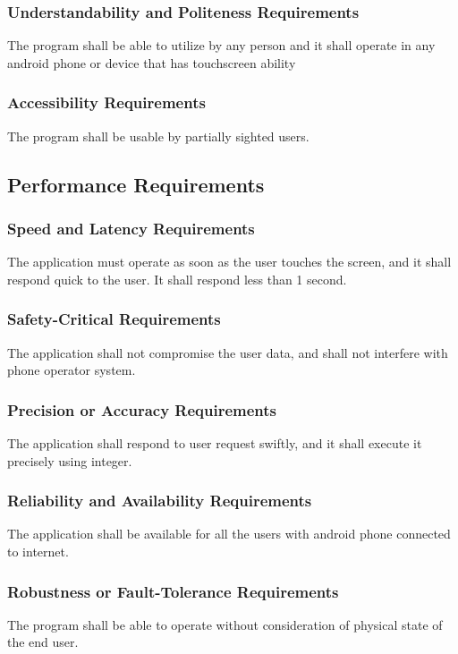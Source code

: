 \documentclass[12pt, titlepage]{article}
\begin{document}
\subsubsection{Understandability and Politeness Requirements}
The program shall be able to utilize by any person and it shall operate in any android phone or device that has touchscreen ability

\subsubsection{Accessibility Requirements}
The program shall be usable by partially sighted users.


\subsection{Performance Requirements}
\subsubsection{Speed and Latency Requirements}
The application must operate as soon as the user touches the screen, and it shall respond quick to the user. It shall respond less than 1 second.

\subsubsection{Safety-Critical Requirements}
The application shall not compromise the user data, and shall not interfere with phone operator system. 

\subsubsection{Precision or Accuracy Requirements}
The application shall respond to user request swiftly, and it shall execute it precisely using integer.

\subsubsection{Reliability and Availability Requirements}
The application shall be available for all the users with android phone connected to internet. 

\subsubsection{Robustness or Fault-Tolerance Requirements}
The program shall be able to operate without consideration of physical state of the end user.
\end{document}
